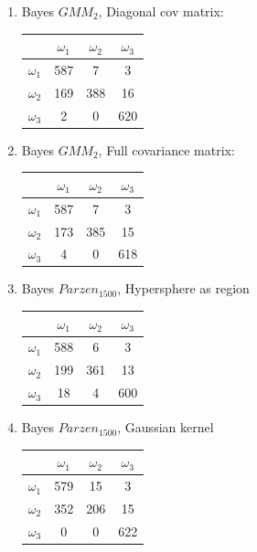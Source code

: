 \documentclass[a4paper]{article}
\begin{document}
\begin{multicols}{2}
\begin{enumerate}
\item Bayes $GMM_{2}$, Diagonal cov matrix:

\begin{tabular}{ | l | c | c | c | }
\hline
& $\omega_1$ & $\omega_2$ & $\omega_3$ \\
\hline
  $\omega_1$ & 587 & 7 & 3 \\
\hline
  $\omega_2$ & 169 & 388 & 16 \\
\hline
  $\omega_3$ & 2 & 0 & 620 \\
\hline
\end{tabular}


\item Bayes $GMM_{2}$, Full covariance matrix:

\begin{tabular}{ | l | c | c | c | }
\hline
& $\omega_1$ & $\omega_2$ & $\omega_3$ \\
\hline
  $\omega_1$ & 587 & 7 & 3 \\
\hline
  $\omega_2$ & 173 & 385 & 15 \\
\hline
  $\omega_3$ & 4 & 0 & 618 \\
\hline
\end{tabular}


\item Bayes $Parzen_{1500}$, Hypersphere as region

\begin{tabular}{ | l | c | c | c | }
\hline
& $\omega_1$ & $\omega_2$ & $\omega_3$ \\
\hline
  $\omega_1$ & 588 & 6 & 3 \\
\hline
  $\omega_2$ & 199 & 361 & 13 \\
\hline
  $\omega_3$ & 18 & 4 & 600 \\
\hline
\end{tabular}


\item Bayes $Parzen_{1500}$, Gaussian kernel

\begin{tabular}{ | l | c | c | c | }
\hline
& $\omega_1$ & $\omega_2$ & $\omega_3$ \\
\hline
  $\omega_1$ & 579 & 15 & 3 \\
\hline
  $\omega_2$ & 352 & 206 & 15 \\
\hline
  $\omega_3$ & 0 & 0 & 622 \\
\hline
\end{tabular}


\end{enumerate}
\end{multicols}
\end{document}
